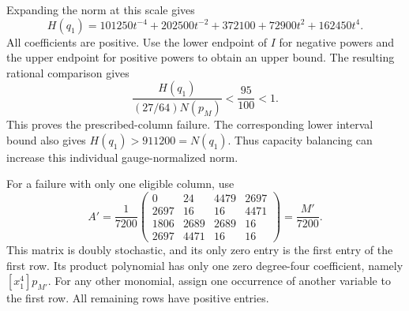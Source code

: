 \documentclass[11pt,a4paper]{article}
\theoremstyle{definition}
\theoremstyle{remark}
\begin{document}
Expanding the norm at this scale gives
\begin{equation}\label{eq:obs-zero-laurent}
 H(q_1)=101250t^{-4}+202500t^{-2}+372100+72900t^2+162450t^4.
\end{equation}
All coefficients are positive. Use the lower endpoint of $I$ for negative
powers and the upper endpoint for positive powers to obtain an upper bound.
The resulting rational comparison gives
\[
 \frac{H(q_1)}{(27/64)N(p_M)}<\frac{95}{100}<1.
\]
This proves the prescribed-column failure.
The corresponding lower interval bound also gives $H(q_1)>911200=N(q_1)$.
Thus capacity balancing can increase this individual gauge-normalized norm.

For a failure with only one eligible column, use
\begin{equation}\label{eq:obs-one-zero-matrix}
 A'=\frac1{7200}\begin{pmatrix}
 0&24&4479&2697\\
 2697&16&16&4471\\
 1806&2689&2689&16\\
 2697&4471&16&16
 \end{pmatrix}=\frac{M'}{7200}.
\end{equation}
This matrix is doubly stochastic, and its only zero entry is the first
entry of the first row.
Its product polynomial has only one zero degree-four coefficient,
namely $[x_1^4]p_{M'}$.
For any other monomial, assign one occurrence of another variable to the
first row. All remaining rows have positive entries.
\end{document}
